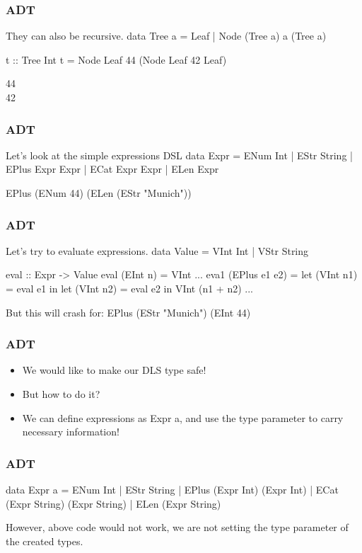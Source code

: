 \documentclass{beamer}
\newenvironment{VerbExample}
{\example\semiverbatim}
{\endsemiverbatim\endexample}
\begin{document}
\begin{frame}[fragile]
  \frametitle{ADT}
  They can also be recursive.
  \begin{VerbExample}
data Tree a = Leaf | Node (Tree a) a (Tree a)

t :: Tree Int
t = Node Leaf 44 (Node Leaf 42 Leaf)

44
 \\
  42
\end{VerbExample}
\end{frame}

\begin{frame}[fragile]
  \frametitle{ADT}
  Let's look at the simple expressions DSL
  \begin{VerbExample}
data Expr
  = ENum Int
  | EStr String
  | EPlus Expr Expr
  | ECat Expr Expr
  | ELen Expr

EPlus (ENum 44) (ELen (EStr "Munich"))
\end{VerbExample}
\end{frame}

\begin{frame}[fragile]
  \frametitle{ADT}
  Let's try to evaluate expressions.
  \begin{VerbExample}
data Value = VInt Int | VStr String

eval :: Expr -> Value
eval (EInt n) = VInt
...
eva1 (EPlus e1 e2) =
  let (VInt n1) = eval e1 in
  let (VInt n2) = eval e2 in
  VInt (n1 + n2)
...

But this will crash for:
EPlus (EStr "Munich") (EInt 44)
\end{VerbExample}
\end{frame}

\begin{frame}[fragile]
  \frametitle{ADT}
  \begin{itemize}
    \item We would like to make our DLS type safe!
    \item But how to do it?
    \item We can define expressions as Expr a, and use the type
    parameter to carry necessary information!
  \end{itemize}
\end{frame}

\begin{frame}[fragile]
  \frametitle{ADT}
  \begin{VerbExample}
data Expr a
  = ENum Int
  | EStr String
  | EPlus (Expr Int) (Expr Int)
  | ECat (Expr String) (Expr String)
  | ELen (Expr String)
\end{VerbExample}

However, above code would not work, we are not setting the type parameter
of the created types.

\end{frame}
\end{document}
